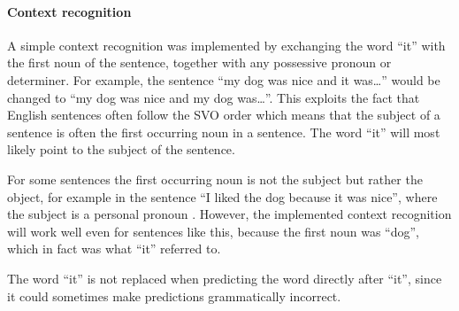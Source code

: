 \paragraph{Context recognition}
A simple context recognition was implemented by exchanging the word “it” with the first noun of the sentence, together with any possessive pronoun or determiner. For example, the sentence “my dog was nice and it was…” would be changed to “my dog was nice and my dog was…”. This exploits the fact that English sentences often follow the SVO order which means that the subject of a sentence is often the first occurring noun in a sentence. The word “it” will most likely point to the subject of the sentence.

For some sentences the first occurring noun is not the subject but rather the object, for example in the sentence “I liked the dog because it was nice”, where the subject is a personal pronoun . However, the implemented context recognition will work well even for sentences like this, because the first noun was “dog”, which in fact was what “it” referred to.

The word “it” is not replaced when predicting the word directly after “it”, since it could sometimes make predictions grammatically incorrect.